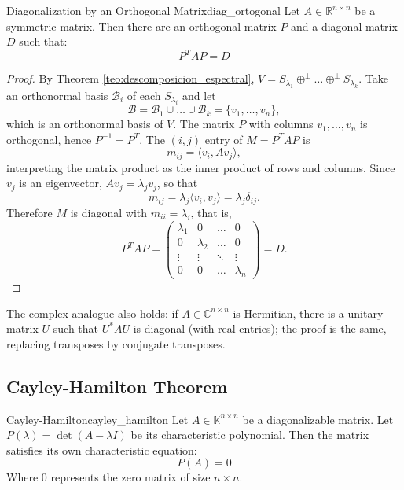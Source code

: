 \documentclass[11pt, a4paper]{article}
\begin{document}
\begin{corolario}{Diagonalization by an Orthogonal Matrix}{diag_ortogonal}
Let $A \in \mathbb{R}^{n \times n}$ be a symmetric matrix.
Then there are an orthogonal matrix $P$ and a diagonal matrix $D$ such that:
\[ P^T A P = D \]
\end{corolario}

\begin{proof}
By Theorem \ref{teo:descomposicion_espectral}, $V = S_{\lambda_1} \oplus^\perp \dots \oplus^\perp S_{\lambda_k}$. Take an orthonormal basis $\mathcal{B}_i$ of each $S_{\lambda_i}$ and let
\[ \mathcal{B} = \mathcal{B}_1 \cup \dots \cup \mathcal{B}_k = \{ v_1, \dots, v_n \}, \]
which is an orthonormal basis of $V$. The matrix $P$ with columns $v_1, \dots, v_n$ is orthogonal, hence $P^{-1} = P^T$. The $(i,j)$ entry of $M = P^T A P$ is
\[ m_{ij} = \langle v_i, A v_j \rangle, \]
interpreting the matrix product as the inner product of rows and columns. Since $v_j$ is an eigenvector, $A v_j = \lambda_j v_j$, so that
\[ m_{ij} = \lambda_j \langle v_i, v_j \rangle = \lambda_j \delta_{ij}. \]
Therefore $M$ is diagonal with $m_{ii} = \lambda_i$, that is,
\[ P^T A P = \begin{pmatrix} \lambda_1 & 0 & \dots & 0 \\ 0 & \lambda_2 & \dots & 0 \\ \vdots & \vdots & \ddots & \vdots \\ 0 & 0 & \dots & \lambda_n \end{pmatrix} = D. \]
\end{proof}

\obs The complex analogue also holds: if $A \in \mathbb{C}^{n \times n}$ is Hermitian, there is a unitary matrix $U$ such that $U^* A U$ is diagonal (with real entries); the proof is the same, replacing transposes by conjugate transposes.

\subsection{Cayley-Hamilton Theorem}

\begin{teorema}{Cayley-Hamilton}{cayley_hamilton}
Let $A \in \mathbb{K}^{n \times n}$ be a diagonalizable matrix.
Let $P(\lambda) = \det(A - \lambda I)$ be its characteristic polynomial.
Then the matrix satisfies its own characteristic equation:
\[ P(A) = 0 \]
Where $0$ represents the zero matrix of size $n \times n$.
\end{teorema}
\end{document}
